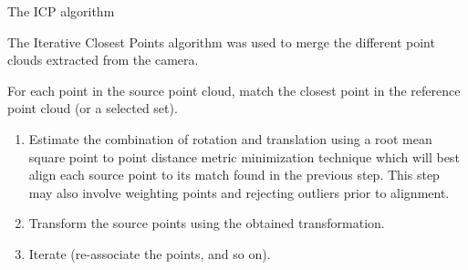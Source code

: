 \documentclass{beamer}
\begin{document}
\begin{frame}{The ICP algorithm}

{\small The Iterative Closest Points algorithm was used to merge the different point clouds extracted from the camera.

For each point in the source point cloud, match the closest point in the reference point cloud (or a selected set).
\begin{enumerate}
	\item Estimate the combination of rotation and translation using a root mean square point to point distance metric minimization technique which will best align each source point to its match found in the previous step. This step may also involve weighting points and rejecting outliers prior to alignment.
	\item Transform the source points using the obtained transformation.
	\item Iterate (re-associate the points, and so on).
\end{enumerate}}
\end{frame}

\end{document}
